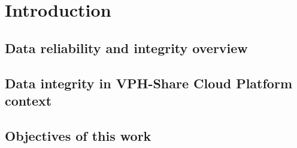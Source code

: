 \chapter{Introduction}
\label{cha:introduction}
	\section{Data reliability and integrity overview}
	\section{Data integrity in VPH-Share Cloud Platform context}
	\section{Objectives of this work}
